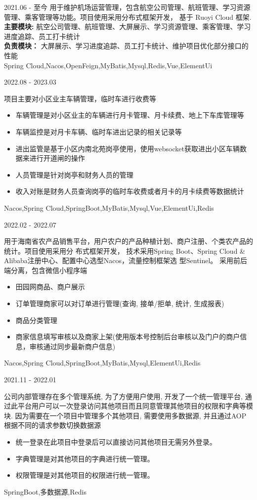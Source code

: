 \documentclass[zh]{resume}
\begin{document}
\begin{projects}
  \project
  {\color{accentcolor}{机场运营管理}}{2021.06 - 至今}
  {
    用于维护机场运营管理，包含航空公司管理、航班管理、学习资源管理、乘客管理等功能。项目使用采用分布式框架开发，
    基于 Ruoyi Cloud 框架. \\
    {\textbf{主要模块: } 航空公司管理、航班管理、大屏展示、学习资源管理、乘客管理、学习进度追踪、员工打卡统计} \\
    {\textbf{负责模块：} 大屏展示、学习进度追踪、员工打卡统计、维护项目优化部分接口的性能} \\
  }
  {Spring Cloud,Nacos,OpenFeign,MyBatis,Mysql,Redis,Vue,ElementUi}

	\project
  {\color{accentcolor}{中谷苑车辆道闸系统}}{2022.08 - 2023.03}
  {
    项目主要对小区业主车辆管理，临时车进行收费等
    \begin{itemize}
      \item 车辆管理是对小区业主的车辆进行月卡管理、月卡续费、地上下车库管理等
      \item 车辆监控是对月卡车辆、临时车进出记录的相关记录等
      \item 进出监管是基于小区内南北苑岗亭使用，使用websocket获取进出小区车辆数据来进行开道闸的操作
      \item 人员管理是针对岗亭和财务人员的管理
      \item 收入对账是财务人员查询岗亭的临时车收费或者月卡的月卡续费等数据统计
    \end{itemize}
  }
  {Nacos,Spring Cloud,SpringBoot,MyBatis,Mysql,Vue,ElementUi,Redis}

	\project
  {\color{accentcolor}{田园网}}{2022.02 - 2022.07}
  {
    用于海南省农产品销售平台，用户农户的产品种植计划、商户注册、个类农产品的统计。项目使用采用分 布式框架开发，
    技术采用Spring Boot、Spring Cloud \& Alibaba注册中心、配置中心选型Nacos，流量控制框架选 型Sentinel。
    采用前后端分离，包含微信小程序端
    \begin{itemize}
      \item 田园网商品、商户展示
      \item 订单管理商家可以对订单进行管理(查询, 接单/拒单, 统计, 生成报表)
      \item 商品分类管理
      \item 商家信息填写审核以及商家上架(使用版本号控制后台审核以及门户的商户信息，审核通过同步最新商户信息)
    \end{itemize}
  }
  {Nacos,Spring Cloud,SpringBoot,MyBatis,Mysql,ElementUi,Redis}

	\project
  {\color{accentcolor}{统一管理平台}}{2021.11 - 2022.01}
  {
    公司内部管理存在多个管理系统, 为了方便用户使用, 开发了一个统一管理平台, 
    通过此平台用户可以一次登录访问其他项目而且同意管理其他项目的权限和字典等模块. 
    因为需要在一个项目中管理多个其他项目, 需要使用多数据源, 并且通过AOP根据不同的请求参数切换数据源
    \begin{itemize}
      \item 统一登录在此项目中登录后可以直接访问其他项目无需另外登录。
      \item 字典管理是对其他项目的字典进行统一管理。
      \item 权限管理是对其他项目的权限进行统一管理。
    \end{itemize}
  }
  {SpringBoot,多数据源,Redis}



\end{projects}
\end{document}
